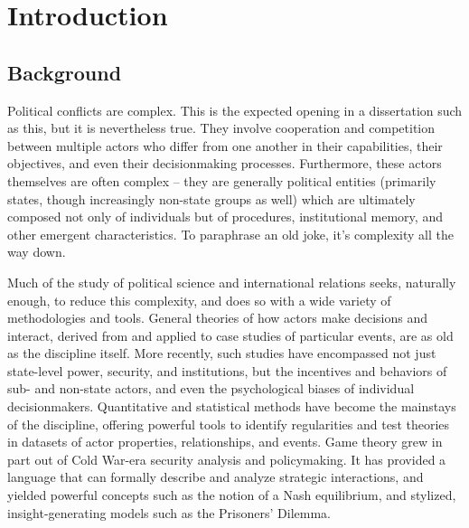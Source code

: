 
\chapter{Introduction}

\section{Background}

Political conflicts are complex. This is the expected opening in a dissertation such as this, but it is nevertheless true. They involve cooperation and competition between multiple actors who differ from one another in their capabilities, their objectives, and even their decisionmaking processes. Furthermore, these actors themselves are often complex -- they are generally political entities (primarily states, though increasingly non-state groups as well) which are ultimately composed not only of individuals but of procedures, institutional memory, and other emergent characteristics. To paraphrase an old joke, it's complexity all the way down.

Much of the study of political science and international relations seeks, naturally enough, to reduce this complexity, and does so with a wide variety of methodologies and tools. General theories of how actors make decisions and interact, derived from and applied to case studies of particular events, are as old as the discipline itself. More recently, such studies have encompassed not just state-level power, security, and institutions, but the incentives and behaviors of sub- and non-state actors, and even the psychological biases of individual decisionmakers. Quantitative and statistical methods have become the mainstays of the discipline, offering powerful tools to identify regularities and test theories in datasets of actor properties, relationships, and events. Game theory grew in part out of Cold War-era security analysis and policymaking. It has provided a language that can formally describe and analyze strategic interactions, and yielded powerful concepts such as the notion of a Nash equilibrium, and stylized, insight-generating models such as the Prisoners' Dilemma.

